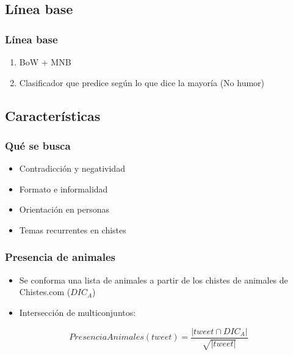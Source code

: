 \subsection{Línea base}
\begin{frame}
    \frametitle{Línea base}

    \begin{enumerate}
        \item BoW + MNB
        \item Clasificador que predice según lo que dice la mayoría (No humor)
    \end{enumerate}
\end{frame}

\subsection{Características}

\begin{frame}
    \frametitle{Qué se busca}

    \begin{itemize}[<+->]
        \item Contradicción y negatividad
        \item Formato e informalidad
        \item Orientación en personas
        \item Temas recurrentes en chistes
    \end{itemize}
\end{frame}

\begin{frame}
    \frametitle{Presencia de animales}

    \begin{itemize}
        \item Se conforma una lista de animales a partir de los chistes de animales de Chistes.com ($DIC_A$)
        \item Intersección de multiconjuntos:
    \end{itemize}

    \begin{center}
        \[
            PresenciaAnimales(tweet) = \frac{|tweet \cap DIC_A|}{\sqrt{|tweet|}}
        \]
    \end{center}
\end{frame}

